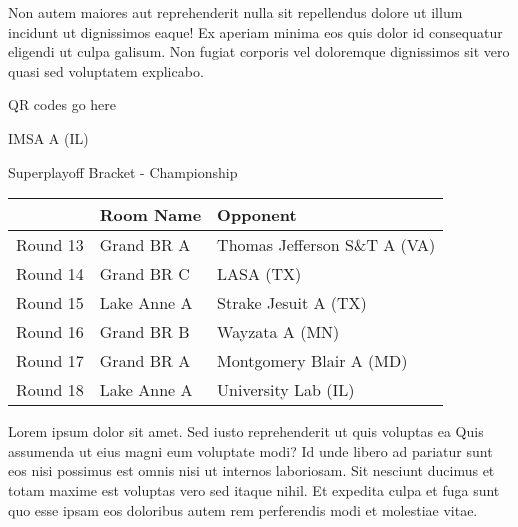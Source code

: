 \documentclass{article}%
\begin{document}
\newline%
Non autem maiores aut reprehenderit nulla sit repellendus dolore ut illum incidunt ut dignissimos eaque! Ex aperiam minima eos quis dolor id consequatur eligendi ut culpa galisum. Non fugiat corporis vel doloremque dignissimos sit vero quasi sed voluptatem explicabo.\newline%
\newline%
%
\vspace*{30pt}%
\begin{center}%
\begin{Huge}%
QR codes go here%
\end{Huge}%
\end{center}%
\newpage%
\begin{center}%
\begin{Huge}%
IMSA A (IL)%
\end{Huge}%
\vspace*{8pt}%
\linebreak%
\begin{Large}%
Superplayoff Bracket {-} Championship%
\end{Large}%
\end{center}%
%
\begin{tabularx}{\textwidth}{|c|Y|Y|}%
\hline%
&Room Name&Opponent\\%
\hline%
Round 13&Grand BR A&Thomas Jefferson S\&T A (VA)\\%
Round 14&Grand BR C&LASA (TX)\\%
Round 15&Lake Anne A&Strake Jesuit A (TX)\\%
Round 16&Grand BR B&Wayzata A (MN)\\%
Round 17&Grand BR A&Montgomery Blair A (MD)\\%
Round 18&Lake Anne A&University Lab (IL)\\%
\hline%
\end{tabularx}%
\vspace*{8pt}%
\linebreak%
\newline%
\newline%
Lorem ipsum dolor sit amet. Sed iusto reprehenderit ut quis voluptas ea Quis assumenda ut eius magni eum voluptate modi? Id unde libero ad pariatur sunt eos nisi possimus est omnis nisi ut internos laboriosam. Sit nesciunt ducimus et totam maxime est voluptas vero sed itaque nihil. Et expedita culpa et fuga sunt quo esse ipsam eos doloribus autem rem perferendis modi et molestiae vitae.\newline%
\end{document}
